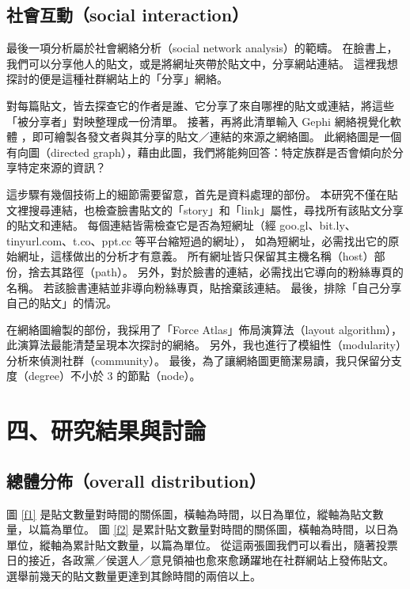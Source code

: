 \documentclass[a4paper, 10pt, conference]{ieeeconf}       %
\begin{document}
\begin{CJK}{UTF8}{bsmi}
\subsection*{社會互動（social interaction）}

最後一項分析屬於社會網絡分析（social network analysis）的範疇。%
在臉書上，我們可以分享他人的貼文，或是將網址夾帶於貼文中，分享網站連結。%
這裡我想探討的便是這種社群網站上的「分享」網絡。%

對每篇貼文，皆去探查它的作者是誰、它分享了來自哪裡的貼文或連結，將這些「被分享者」對映整理成一份清單。%
接著，再將此清單輸入 Gephi 網絡視覺化軟體 \cite{c15}，即可繪製各發文者與其分享的貼文／連結的來源之網絡圖。%
此網絡圖是一個有向圖（directed graph），藉由此圖，我們將能夠回答：特定族群是否會傾向於分享特定來源的資訊？%

這步驟有幾個技術上的細節需要留意，首先是資料處理的部份。%
本研究不僅在貼文裡搜尋連結，也檢查臉書貼文的「story」和「link」屬性，尋找所有該貼文分享的貼文和連結。%
每個連結皆需檢查它是否為短網址（經 goo.gl、bit.ly、tinyurl.com、t.co、ppt.cc 等平台縮短過的網址），%
如為短網址，必需找出它的原始網址，這樣做出的分析才有意義。%
所有網址皆只保留其主機名稱（host）部份，捨去其路徑（path）。%
另外，對於臉書的連結，必需找出它導向的粉絲專頁的名稱。%
若該臉書連結並非導向粉絲專頁，貼捨棄該連結。%
最後，排除「自己分享自己的貼文」的情況。%

在網絡圖繪製的部份，我採用了「Force Atlas」佈局演算法（layout algorithm），此演算法最能清楚呈現本次探討的網絡。%
另外，我也進行了模組性（modularity）分析來偵測社群（community）。%
最後，為了讓網絡圖更簡潔易讀，我只保留分支度（degree）不小於 3 的節點（node）。%

\section*{四、研究結果與討論}

\subsection*{總體分佈（overall distribution）}

圖 \ref{f1} 是貼文數量對時間的關係圖，橫軸為時間，以日為單位，縱軸為貼文數量，以篇為單位。%
圖 \ref{f2} 是累計貼文數量對時間的關係圖，橫軸為時間，以日為單位，縱軸為累計貼文數量，以篇為單位。%
從這兩張圖我們可以看出，隨著投票日的接近，各政黨／侯選人／意見領袖也愈來愈踴躍地在社群網站上發佈貼文。%
選舉前幾天的貼文數量更達到其餘時間的兩倍以上。%


\end{CJK}
\end{document}
